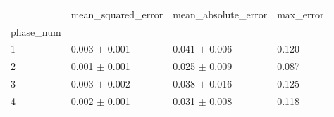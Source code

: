 \begin{tabular}{llll}
\toprule
 & mean_squared_error & mean_absolute_error & max_error \\
phase_num &  &  &  \\
\midrule
1 & 0.003 $\pm$ 0.001 & 0.041 $\pm$ 0.006 & 0.120 \\
2 & 0.001 $\pm$ 0.001 & 0.025 $\pm$ 0.009 & 0.087 \\
3 & 0.003 $\pm$ 0.002 & 0.038 $\pm$ 0.016 & 0.125 \\
4 & 0.002 $\pm$ 0.001 & 0.031 $\pm$ 0.008 & 0.118 \\
\bottomrule
\end{tabular}
